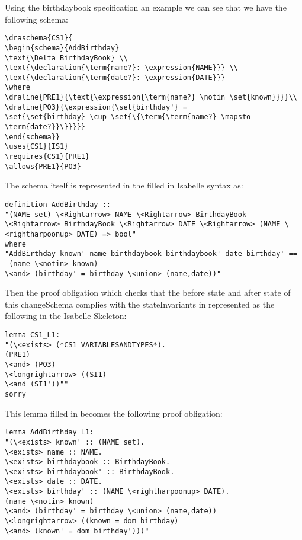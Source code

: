 Using the birthdaybook specification an example we can see that we have the
following schema:

\begin{verbatim}
\draschema{CS1}{
\begin{schema}{AddBirthday}
\text{\Delta BirthdayBook} \\
\text{\declaration{\term{name?}: \expression{NAME}}} \\
\text{\declaration{\term{date?}: \expression{DATE}}}
\where
\draline{PRE1}{\text{\expression{\term{name?} \notin \set{known}}}}\\
\draline{PO3}{\expression{\set{birthday'} =
\set{\set{birthday} \cup \set{\{\term{\term{name?} \mapsto \term{date?}}\}}}}}
\end{schema}}
\uses{CS1}{IS1}
\requires{CS1}{PRE1}
\allows{PRE1}{PO3}
\end{verbatim}

The schema itself is represented in the filled in Isabelle syntax as:

\begin{verbatim}
definition AddBirthday :: 
"(NAME set) \<Rightarrow> NAME \<Rightarrow> BirthdayBook 
\<Rightarrow> BirthdayBook \<Rightarrow> DATE \<Rightarrow> (NAME \<rightharpoonup> DATE) => bool"
where 
"AddBirthday known' name birthdaybook birthdaybook' date birthday' ==
 (name \<notin> known)
\<and> (birthday' = birthday \<union> (name,date))"
\end{verbatim}

Then the proof obligation which checks that the before state and after state of
this changeSchema complies with the stateInvariants in represented as the
following in the Isabelle Skeleton:

\begin{verbatim}
lemma CS1_L1:
"(\<exists> (*CS1_VARIABLESANDTYPES*).
(PRE1)
\<and> (PO3)
\<longrightarrow> ((SI1)
\<and (SI1'))""
sorry
\end{verbatim}

This lemma filled in becomes the following proof obligation:

\begin{verbatim}
lemma AddBirthday_L1:
"(\<exists> known' :: (NAME set).
\<exists> name :: NAME.
\<exists> birthdaybook :: BirthdayBook.
\<exists> birthdaybook' :: BirthdayBook.
\<exists> date :: DATE.
\<exists> birthday' :: (NAME \<rightharpoonup> DATE).
(name \<notin> known)
\<and> (birthday' = birthday \<union> (name,date))
\<longrightarrow> ((known = dom birthday)
\<and> (known' = dom birthday')))"
\end{verbatim}


